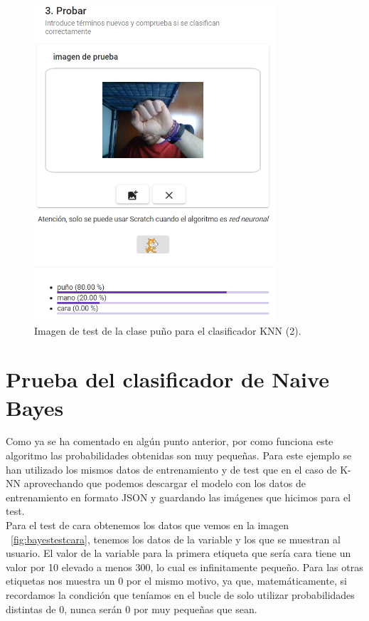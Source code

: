 \documentclass[a4paper, 12pt]{book}
\begin{document}
\begin{figure}
	\centering
	\includegraphics[width=9cm, keepaspectratio]{img/testpunoknnmal}
	\caption{Imagen de test de la clase puño para el clasificador KNN (2).}			
	\label{fig:testpunoknnmal}
\end{figure}



\section{Prueba del clasificador de Naive Bayes} 
\label{sec:pruebabayes}

Como ya se ha comentado en algún punto anterior, por como funciona este algoritmo las probabilidades obtenidas son muy pequeñas. Para este ejemplo se han utilizado los mismos datos de entrenamiento y de test que en el caso de K-NN aprovechando que podemos descargar el modelo con los datos de entrenamiento en formato JSON y guardando las imágenes que hicimos para el test.\\
Para el test de cara obtenemos los datos que vemos en la imagen ~\ref{fig:bayestestcara}, tenemos los datos de la variable y los que se muestran al usuario. El valor de la variable para la primera etiqueta que sería cara tiene un valor por 10 elevado a menos 300, lo cual es infinitamente pequeño. Para las otras etiquetas nos muestra un 0 por el mismo motivo, ya que, matemáticamente, si recordamos la condición que teníamos en el bucle de solo utilizar probabilidades distintas de 0, nunca serán 0 por muy pequeñas que sean.
\end{document}
